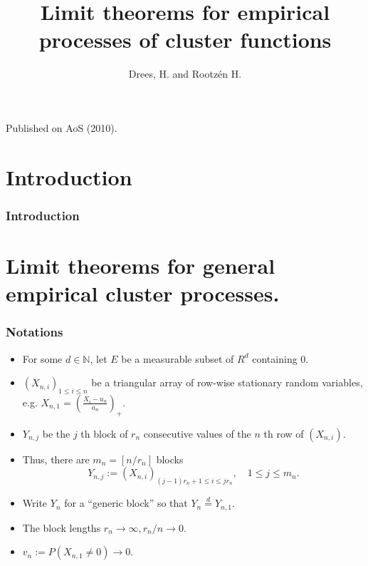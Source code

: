 \documentclass{beamer}
\author{Drees, H. and Rootz\'en H.}
\title{Limit theorems for empirical processes of cluster functions}
\date{}
\newcommand{\suit}[1]{\left(#1\right)}
\newcommand{\xseq}{\suit{X_{n,i}}_{1\le i\le n}}
\begin{document}
\begin{frame}
\titlepage

\begin{center}
    \vspace{-16ex}
    Published on AoS (2010).
\end{center}
\end{frame}

\section{Introduction}
\begin{frame}
    \frametitle{Introduction}

    

\end{frame}

\section{Limit theorems for general empirical cluster processes.}

\begin{frame}
    \frametitle{Notations}
    \begin{itemize}
        \item For some $d\in \mathbb{N}$, let $E$ be a measurable subset of $R^d$ containing $0$.
        \item $\xseq$ be a triangular array of row-wise stationary random variables, e.g. $X_{n,1}  =(\frac{X_i-u_n}{a_n})_{+}$.
        \item $Y_{n,j}$ be the $j$ th block of $r_n$ consecutive values of the $n$ th row of $(X_{n,i})$.
        \item Thus, there are $m_n=[n/r_n]$ blocks 
        $$
            Y_{n,j}:= (X_{n,i})_{(j-1)r_n+1\le i\le jr_n}, \quad 1\le j \le m_n.
        $$
        \item  Write $Y_n$ for a “generic block” so that $Y_n\stackrel{d}{=} Y_{n,1}$.
        \item The block lengths $r_n\to\infty, r_n/n\to 0$.
        \item $v_n:=P\suit{X_{n,1}\ne 0}\to 0$.
    \end{itemize}

    

\end{frame}
\end{document}
